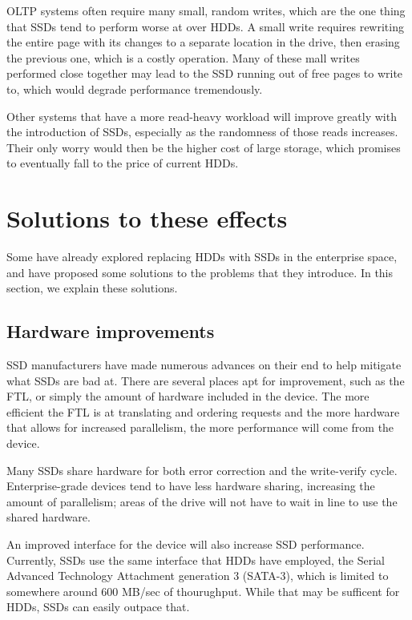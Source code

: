 \documentclass[format=acmsmall, review=false, screen=true]{acmart}
\begin{document}
OLTP systems often require many small, random writes, which are the one thing that SSDs tend to perform worse at over 
HDDs. A small write requires rewriting the entire page with its changes to a separate location in the drive, then erasing 
the previous one, which is a costly operation. Many of these mall writes performed close together may lead to the SSD 
running out of free pages to write to, which would degrade performance tremendously. 
\cite{Cornwell2012, Micheloni2013, MatejFucek2014, Chen2016}

Other systems that have a more read-heavy workload will improve greatly with the introduction of SSDs, especially as the 
randomness of those reads increases. Their only worry would then be the higher cost of large storage, which promises to 
eventually fall to the price of current HDDs. \cite{Chen2016}

\section{Solutions to these effects}

Some have already explored replacing HDDs with SSDs in the enterprise space, and have proposed some solutions to the 
problems that they introduce. In this section, we explain these solutions.

\subsection{Hardware improvements}

SSD manufacturers have made numerous advances on their end to help mitigate what SSDs are bad at. There are several 
places apt for improvement, such as the FTL, or simply the amount of hardware included in the device. The more efficient 
the FTL is at translating and ordering requests and the more hardware that allows for increased parallelism, the more 
performance will come from the device. \cite{Xie2011, Chen2016}

Many SSDs share hardware for both error correction and the write-verify cycle. Enterprise-grade devices tend to have 
less hardware sharing, increasing the amount of parallelism; areas of the drive will not have to wait in line to use 
the shared hardware. \cite{Dirik2009, Cornwell2012, Micheloni2013, MatejFucek2014, Chen2016}

An improved interface for the device will also increase SSD performance. Currently, SSDs use the same interface that 
HDDs have employed, the Serial Advanced Technology Attachment generation 3 (SATA-3), which is limited to somewhere around
600 MB/sec of thourughput. While that may be sufficent for HDDs, SSDs can easily outpace that. \cite{Micheloni2013}
\end{document}
